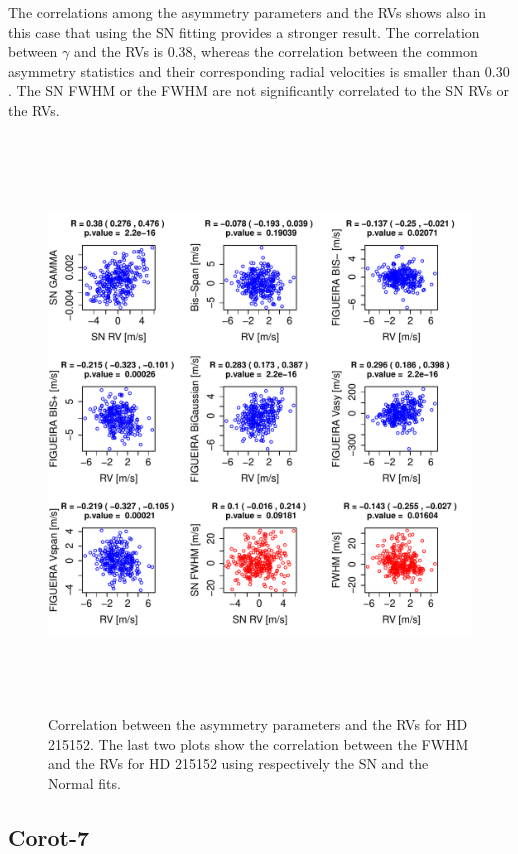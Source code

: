 \documentclass[11pt, oneside]{article}
\begin{document}
The correlations among the asymmetry parameters and the RVs shows also in this case that using the SN fitting provides a stronger result. The correlation between $\gamma$ and the RVs is $0.38$, whereas the correlation between the common asymmetry statistics and their corresponding radial velocities is smaller than $0.30$. The SN FWHM or the FWHM are not significantly correlated to the SN RVs or the RVs.
%
\begin{figure}[htbp]
   \centering
\includegraphics[height = 6in]{HD21515_[4]Comparison_para.pdf}  
   \caption{Correlation between the asymmetry parameters and the RVs for HD 215152. The last two plots show the correlation between the FWHM and the RVs for HD 215152 using respectively the SN and the Normal fits.}
   \label{fig:HD215152:corrPlot}
\end{figure}



\subsection{Corot-7}  \label{sec:Corot7}
\end{document}
